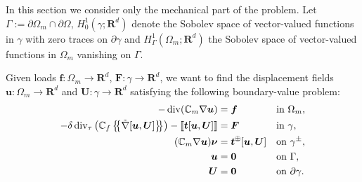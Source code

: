 \documentclass[a4paper]{article}
\def\agrad{\tilde\nabla}
\def\avg#1{\left\{\mskip-5mu\left\{#1\right\}\mskip-5mu\right\}}
\def\div{\operatorname{div}}
\def\FF{\vc F}
\def\ff{\vc f}
\def\jmp#1{\left\llbracket #1 \right\rrbracket}
\def\nnu{\vc\nu}
\def\prtl{\partial}
\def\Real{{\mathbf R}}
\def\tn#1{{\mathbb{#1}}}    %
\def\tt{\vc t}
\def\U{\vc U}
\def\uu{\vc u}
\def\vc#1{\mathbf{\boldsymbol{#1}}}     %
\newcommand{\opm}{ %
  {\mathbin{
    \mathchoice
      {\buildcirclepm{\displaystyle     }{0.14ex}{0.95}{0.05ex}{.7}}
      {\buildcirclepm{\textstyle        }{0.14ex}{0.95}{0.05ex}{.7}}
      {\buildcirclepm{\scriptstyle      }{0.13ex}{0.955}{0.04ex}{.55}}
      {\buildcirclepm{\scriptscriptstyle}{0.08ex}{0.95}{0.03ex}{.45}}
  }} 
}
\newcommand\buildcirclepm[5]{%
  \begin{tikzpicture}[baseline=(X.base), inner sep=-#5, outer sep=-.65]
    \node[draw,circle,line width=#4] (X)  {\footnotesize\raisebox{#2}{\scalebox{#3}{$#1\pm$}}};
  \end{tikzpicture}%
}
\begin{document}
In this section we consider only the mechanical part of the problem.
Let $\Gamma:=\prtl\Omega_m\cap\prtl\Omega$, $H^1_0(\gamma;\Real^d)$ denote the Sobolev space of vector-valued functions in $\gamma$ with zero traces on $\prtl\gamma$ and $H^1_\Gamma(\Omega_m;\Real^d)$ the Sobolev space of vector-valued functions in $\Omega_m$ vanishing on $\Gamma$.

Given loads $\ff:\Omega_m\to\Real^d$, $\FF:\gamma\to\Real^d$, we want to find the displacement fields $\uu:\Omega_m\to\Real^d$ and $\U:\gamma\to\Real^d$ satisfying the following boundary-value problem:
\begin{subequations}\label{eq:lin_el_problem}
\begin{align}
-\div(\tn C_m\nabla\uu) &= \ff &&\mbox{in }\Omega_m,\\
-\delta\div_\tau\left(\tn C_f\avg{\agrad[\uu,\U]} \right) - \jmp{\tt[\uu,\U]} &= \FF &&\mbox{in }\gamma,\\
(\tn C_m\nabla\uu)\nnu &= \tt^\opm[\uu,\U] &&\mbox{on }\gamma^\pm,\\
\uu &=\vc0&&\mbox{on }\Gamma,\\
\U &=\vc 0&&\mbox{on }\prtl\gamma.
\end{align}
\end{subequations}
\end{document}
